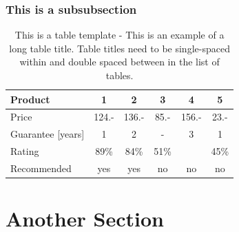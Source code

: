 \subsubsection{This is a subsubsection}
\begin{table}[H]
\centering
\caption{This is a table template - This is an example of a long table title.  Table titles need to be single-spaced within and double spaced between in the list of tables.}
\begin{tabular}{|l|c|c|c|c|c|}
\hline
Product & 1 & 2 & 3 & 4 & 5\\
\hline
Price & 124.- & 136.- & 85.- & 156.- & 23.-\\
Guarantee [years] & 1 & 2 & - & 3 & 1\\
Rating & 89\% & 84\% & 51\% & & 45\%\\
\hline
\hline
Recommended & yes & yes & no & no & no\\
\hline
\end{tabular}
\label{tab:template1-2}
\end{table}
\section{Another Section}
